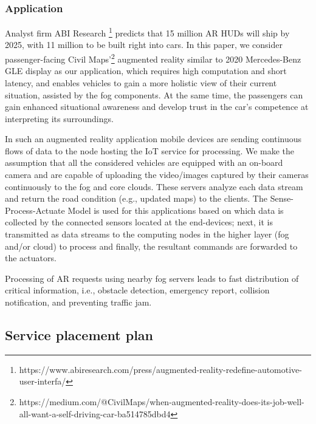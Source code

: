 \documentclass[twocolumn]{article}
\begin{document}
\subsubsection{Application}
\par Analyst firm ABI Research \footnote{https://www.abiresearch.com/press/augmented-reality-redefine-automotive-user-interfa/} predicts that 15 million AR HUDs will ship by 2025, with 11 million to be built right into cars. In this paper, we consider passenger-facing Civil Maps'\footnote{https://medium.com/@CivilMaps/when-augmented-reality-does-its-job-well-all-want-a-self-driving-car-ba514785dbd4} augmented reality similar to 2020 Mercedes-Benz GLE\cite{abdi2015vehicle} display as our application, which requires high computation and short latency, and enables vehicles to gain a more holistic view of their current situation, assisted by the fog components. At the same time, the passengers can gain enhanced situational awareness and develop trust in the car’s competence at interpreting its surroundings.

\par In such an augmented reality application mobile devices are sending continuous flows of data to the node hosting the IoT service for processing\cite{li2017leveraging,rao2012cloud}.
We make the assumption that all the considered vehicles are equipped with an on-board camera and are capable of uploading the video/images captured by their cameras continuously to the fog and core clouds. These servers analyze each data stream and return the road condition (e.g., updated maps) to the clients. The Sense-Process-Actuate Model is used for this applications based on which data is collected by the connected sensors located at the end-devices; next, it is transmitted as data streams to the computing nodes in the higher layer (fog and/or cloud) to process and finally, the resultant commands are forwarded to the actuators\cite{azizi2019priority,gupta2017ifogsim}.

\par Processing of AR requests using nearby fog servers leads to fast distribution of critical information, i.e., obstacle detection, emergency report, collision notification, and preventing traffic jam\cite{li2018end}.
\subsection{Service placement plan}
\end{document}
